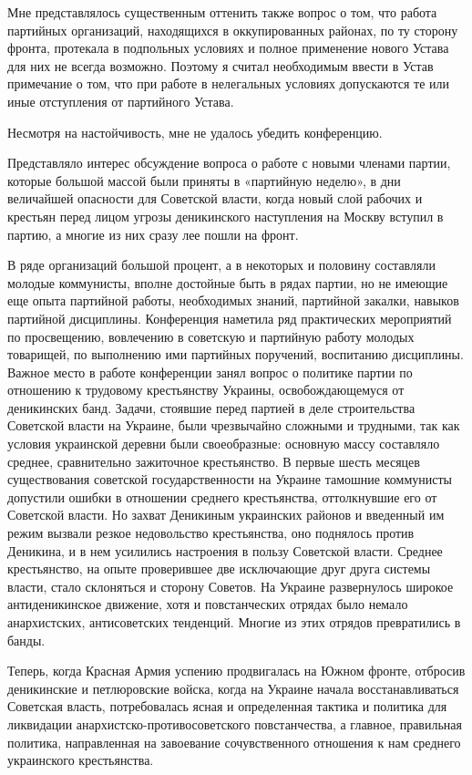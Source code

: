 \documentclass[12pt, a4paper, openany]{book}
\begin{document}
Мне представлялось существенным оттенить также вопрос о том, что работа партийных организаций, находящихся в оккупированных районах, по ту сторону фронта, протекала в подпольных условиях и полное применение нового Устава для них не всегда возможно. Поэтому я считал необходимым ввести в Устав примечание о том, что при работе в нелегальных условиях допускаются те или иные отступления от партийного Устава.

Несмотря на настойчивость, мне не удалось убедить конференцию.

Представляло интерес обсуждение вопроса о работе с новыми членами партии, которые большой массой были приняты в «партийную неделю», в дни величайшей опасности для Советской власти, когда новый слой рабочих и крестьян перед лицом угрозы деникинского наступления на Москву вступил в партию, а многие из них сразу лее пошли на фронт.

В ряде организаций большой процент, а в некоторых и половину составляли молодые коммунисты, вполне достойные быть в рядах партии, но не имеющие еще опыта партийной работы, необходимых знаний, партийной закалки, навыков партийной дисциплины. Конференция наметила ряд практических мероприятий по просвещению, вовлечению в советскую и партийную работу молодых товарищей, по выполнению ими партийных поручений, воспитанию дисциплины. Важное место в работе конференции занял вопрос о политике партии по отношению к трудовому крестьянству Украины, освобождающемуся от деникинских банд. Задачи, стоявшие перед партией в деле строительства Советской власти на Украине, были чрезвычайно сложными и трудными, так как условия украинской деревни были своеобразные: основную массу составляло среднее, сравнительно зажиточное крестьянство. В первые шесть месяцев существования советской государственности на Украине тамошние коммунисты допустили ошибки в отношении среднего крестьянства, оттолкнувшие его от Советской власти. Но захват Деникиным украинских районов и введенный им режим вызвали резкое недовольство крестьянства, оно поднялось против Деникина, и в нем усилились настроения в пользу Советской власти. Среднее крестьянство, на опыте проверившее две исключающие друг друга системы власти, стало склоняться и сторону Советов. На Украине развернулось широкое антиденикинское движение, хотя и повстанческих отрядах было немало анархистских, антисоветских тенденций. Многие из этих отрядов превратились в банды.

Теперь, когда Красная Армия успению продвигалась на Южном фронте, отбросив деникинские и петлюровские войска, когда на Украине начала восстанавливаться Советская власть, потребовалась ясная и определенная тактика и политика для ликвидации анархистско-противосоветского повстанчества, а главное, правильная политика, направленная на завоевание сочувственного отношения к нам среднего украинского крестьянства.
\end{document}
